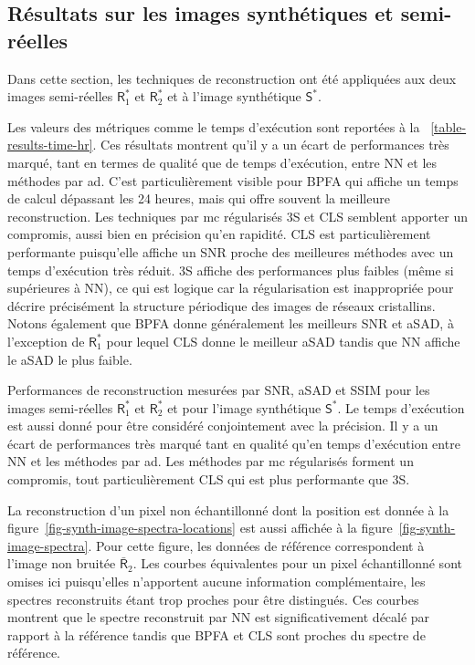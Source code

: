 \subsection{Résultats sur les images synthétiques et semi-réelles}\label{sec-results-hr-synth}

Dans cette section, les techniques de reconstruction ont été appliquées aux deux images semi-réelles $\mathsf{R}_1^*$ et $\mathsf{R}_2^*$ et à l'image synthétique $\mathsf{S}^*$.

Les valeurs des métriques comme le temps d'exécution sont reportées à la \tabname~\ref{table-results-time-hr}. Ces résultats montrent qu'il y a un écart de performances très marqué, tant en termes de qualité que de temps d'exécution, entre NN et les méthodes par \gls{ad}. C'est particulièrement visible pour BPFA qui affiche un temps de calcul dépassant les 24 heures, mais qui offre souvent la meilleure reconstruction. Les techniques par \gls{mc} régularisés 3S et CLS semblent apporter un compromis, aussi bien en précision qu'en rapidité. CLS est particulièrement performante puisqu'elle affiche un SNR proche des meilleures méthodes avec un temps d'exécution très réduit. 3S affiche des performances plus faibles (même si supérieures à NN), ce qui est logique car la régularisation est inappropriée pour décrire précisément la structure périodique des images de réseaux cristallins. Notons également que BPFA donne généralement les meilleurs SNR et aSAD, à l'exception de $\mathsf{R}_1^*$ pour lequel CLS donne le meilleur aSAD tandis que NN affiche le aSAD le plus faible.

\begin{normalfigure*}[htbp]
    \centering
    
    \caption{Performances de reconstruction mesurées par SNR, aSAD et SSIM pour les images semi-réelles $\mathsf{R}_1^*$ et $\mathsf{R}_2^*$ et pour l'image synthétique $\mathsf{S}^*$. Le temps d'exécution est aussi donné pour être considéré conjointement avec la précision. Il y a un écart de performances très marqué tant en qualité qu'en temps d'exécution entre NN et les méthodes par \gls{ad}. Les méthodes par \gls{mc} régularisés forment un compromis, tout particulièrement CLS qui est plus performante que 3S.
        \protect\label{table-results-time-hr}}
\end{normalfigure*}

La reconstruction d'un pixel non échantillonné dont la position est donnée à la figure~\ref{fig-synth-image-spectra-locations} est aussi affichée à la figure~\ref{fig-synth-image-spectra}. Pour cette figure, les données de référence correspondent à l'image non bruitée $\bar{\mathsf{R}}_2$. Les courbes équivalentes pour un pixel échantillonné sont omises ici puisqu'elles n'apportent aucune information complémentaire, les spectres reconstruits étant trop proches pour être distingués.
%
Ces courbes montrent que le spectre reconstruit par NN est significativement décalé par rapport à la référence tandis que BPFA et CLS sont proches du spectre de référence. 

